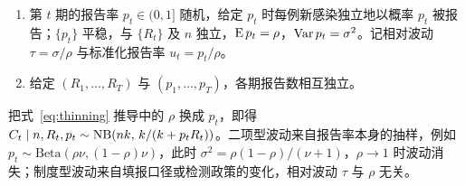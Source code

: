 \begin{enumerate}[label=H\arabic*,start=5]
  \item 第 $t$ 期的报告率 $p_t\in(0,1]$ 随机，给定 $p_t$ 时每例新感染独立地以概率 $p_t$ 被报告；$\{p_t\}$ 平稳，与 $\{R_t\}$ 及 $n$ 独立，$\operatorname{E} p_t=\rho$，$\operatorname{Var} p_t=\sigma^2$。记相对波动 $\tau=\sigma/\rho$ 与标准化报告率 $u_t=p_t/\rho$。
  \item 给定 $(R_1,\dots,R_T)$ 与 $(p_1,\dots,p_T)$，各期报告数相互独立。
\end{enumerate}

把式~\eqref{eq:thinning} 推导中的 $\rho$ 换成 $p_t$，即得 $C_t\mid n,R_t,p_t\sim\operatorname{NB}(nk,\,k/(k+p_tR_t))$。二项型波动来自报告率本身的抽样，例如 $p_t\sim\mathrm{Beta}(\rho\nu,(1-\rho)\nu)$，此时 $\sigma^2=\rho(1-\rho)/(\nu+1)$，$\rho\to1$ 时波动消失；制度型波动来自填报口径或检测政策的变化，相对波动 $\tau$ 与 $\rho$ 无关。


